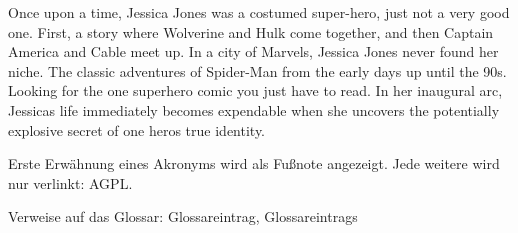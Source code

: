 Once upon a time, Jessica Jones was a costumed super-hero, just not a very good one. First, a story where Wolverine and Hulk come together, and then Captain America and Cable meet up. In a city of Marvels, Jessica Jones never found her niche. The classic adventures of Spider-Man from the early days up until the 90s. Looking for the one superhero comic you just have to read. In her inaugural arc, Jessicas life immediately becomes expendable when she uncovers the potentially explosive secret of one heros true identity. \cite{Testbuch}

Erste Erwähnung eines Akronyms wird als Fußnote angezeigt. Jede weitere wird
nur verlinkt: \acf{AGPL}. \cite{fsf:2007}

Verweise auf das Glossar: \gls{Glossareintrag}, \glspl{Glossareintrag}

\fi